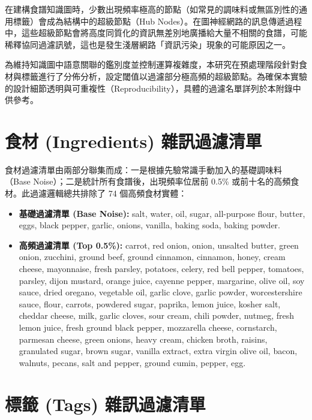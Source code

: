 
\label{app:preprocessing}

在建構食譜知識圖時，少數出現頻率極高的節點（如常見的調味料或無區別性的通用標籤）會成為結構中的超級節點（Hub Nodes）。在圖神經網路的訊息傳遞過程中，這些超級節點會將高度同質化的資訊無差別地廣播給大量不相關的食譜，可能稀釋協同過濾訊號，這也是發生淺層網路「資訊污染」現象的可能原因之一。

為維持知識圖中語意關聯的鑑別度並控制運算複雜度，本研究在預處理階段針對食材與標籤進行了分佈分析，設定閾值以過濾部分極高頻的超級節點。為確保本實驗的設計細節透明與可重複性（Reproducibility），具體的過濾名單詳列於本附錄中供參考。

\section{食材 (Ingredients) 雜訊過濾清單}

食材過濾清單由兩部分聯集而成：一是根據先驗常識手動加入的基礎調味料（Base Noise）；二是統計所有食譜後，出現頻率位居前 0.5\% 或前十名的高頻食材。此過濾邏輯總共排除了 74 個高頻食材實體：

\begin{itemize}[leftmargin=2em]
  \item \textbf{基礎過濾清單 (Base Noise):} salt, water, oil, sugar, all-purpose flour, butter, eggs, black pepper, garlic, onions, vanilla, baking soda, baking powder.
  \item \textbf{高頻過濾清單 (Top 0.5\%):} carrot, red onion, onion, unsalted butter, green onion, zucchini, ground beef, ground cinnamon, cinnamon, honey, cream cheese, mayonnaise, fresh parsley, potatoes, celery, red bell pepper, tomatoes, parsley, dijon mustard, orange juice, cayenne pepper, margarine, olive oil, soy sauce, dried oregano, vegetable oil, garlic clove, garlic powder, worcestershire sauce, flour, carrots, powdered sugar, paprika, lemon juice, kosher salt, cheddar cheese, milk, garlic cloves, sour cream, chili powder, nutmeg, fresh lemon juice, fresh ground black pepper, mozzarella cheese, cornstarch, parmesan cheese, green onions, heavy cream, chicken broth, raisins, granulated sugar, brown sugar, vanilla extract, extra virgin olive oil, bacon, walnuts, pecans, salt and pepper, ground cumin, pepper, egg.
\end{itemize}

\section{標籤 (Tags) 雜訊過濾清單}

